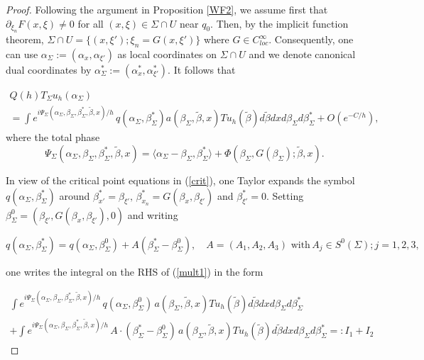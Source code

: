 \documentclass[10pt,a4paper]{amsart}
\begin{document}
\begin{proof}
Following the argument in Proposition \ref{WF2}, we
assume first that $\partial_{\xi_n} F (x,\xi) \neq 0$ for all $(x,\xi) \in \Sigma \cap U$ near $q_0.$ Then, by the implicit function theorem, $ \Sigma \cap U = \{ (x, \xi'); \xi_n = G(x,\xi') \}$ where $G \in C^{\infty}_{loc}.$ Consequently, one can use $\alpha_{\Sigma} := (\alpha_x, \alpha_{\xi'})$ as local coordinates on $\Sigma \cap U$ and we denote canonical dual coordinates by $\alpha_{\Sigma}^*:= (\alpha_x^*,\alpha_{\xi'}^*).$ It follows that



\begin{align} \label{mult1}
Q(h) T_{\Sigma} u_h (\alpha_{\Sigma})  \hspace{4in} \nonumber \\
= \int e^{i \Psi_{\Sigma}(\alpha_{\Sigma}, \beta_{\Sigma}, \beta_{\Sigma}^*, \tilde{\beta},x)/h} \, q(\alpha_{\Sigma}, \beta_{\Sigma}^*) a (\beta_{\Sigma}, \tilde{\beta},x) Tu_h(\tilde{\beta}) d\tilde{\beta}  dx d\beta_{\Sigma} d \beta_{\Sigma}^*  + O(e^{-C/h}),
\end{align}
where the total phase
\begin{equation} \label{mult2}
\Psi_{\Sigma}(\alpha_{\Sigma}, \beta_{\Sigma},\beta_{\Sigma}^*, \tilde{\beta},x) = \langle \alpha_{\Sigma} - \beta_{\Sigma}, \beta_{\Sigma}^* \rangle + \Phi( \beta_\Sigma, G(\beta_{\Sigma}); \tilde{\beta},x).
\end{equation}

In view of the critical point equations in (\ref{crit}), one Taylor expands the symbol $q(\alpha_{\Sigma}, \beta_{\Sigma}^*)$ around $\beta_{x'}^* = \beta_{\xi'}, \, \beta_{x_n}^* = G(\beta_x, \beta_{\xi'})$ and $\beta_{\xi'}^* = 0.$ Setting $\beta_{\Sigma}^{0} = (  \beta_{\xi'},  G(\beta_x, \beta_{\xi'}), 0)$ and writing

$$ 
q(\alpha_{\Sigma}, \beta_{\Sigma}^*) = q(\alpha_{\Sigma}, \beta_{\Sigma}^{0}) + A ( \beta^{*}_{\Sigma} - \beta_{\Sigma}^{0}  ), \quad A = (A_1,A_2,A_3) \text{ with} \, A_j \in S^{0}(\Sigma); j=1,2,3,
$$

one writes the integral on the RHS of (\ref{mult1}) in the form


\begin{align} \label{mult3}
 \int e^{i \Psi_{\Sigma}(\alpha_{\Sigma}, \beta_{\Sigma}, \beta_{\Sigma}^*, \tilde{\beta},x)/h} \, q(\alpha_{\Sigma}, \beta_{\Sigma}^{0}) \, a (\beta_{\Sigma}, \tilde{\beta},x) Tu_h(\tilde{\beta}) d\tilde{\beta}  dx d\beta_{\Sigma} d \beta_{\Sigma}^* \nonumber \\
 + \int e^{i \Psi_{\Sigma}(\alpha_{\Sigma}, \beta_{\Sigma}, \beta_{\Sigma}^*, \tilde{\beta},x)/h} \, A \cdot ( \beta^{*}_{\Sigma} - \beta_{\Sigma}^{0}  )  \, a (\beta_{\Sigma}, \tilde{\beta},x) Tu_h(\tilde{\beta}) d\tilde{\beta}  dx d\beta_{\Sigma} d \beta_{\Sigma}^*=: I_1 + I_2
\end{align}



\end{proof}
\end{document}
